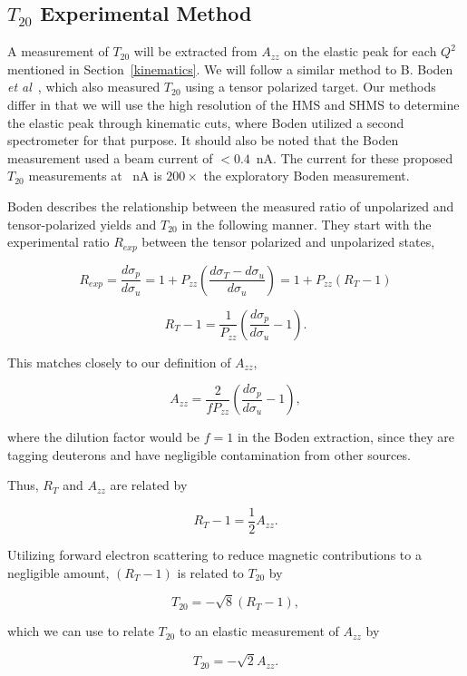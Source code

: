 \subsection{$T_{20}$ Experimental Method} %
\label{t20_exp}

A measurement of $T_{20}$ will be extracted from $A_{zz}$ on the elastic peak for each $Q^2$ mentioned in Section~\ref{kinematics}. We will follow a similar method to B. Boden \emph{et al}~\cite{Boden:1990una}, which also measured $T_{20}$ using a tensor polarized target. Our methods differ in that we will use the high resolution of the HMS and SHMS to determine the elastic peak through kinematic cuts, where Boden utilized a second spectrometer for that purpose. It should also be noted that the Boden measurement used a beam current of $<0.4$~nA. The current for these proposed $T_{20}$ measurements at \CURRENT~nA is $200\times$ the exploratory Boden measurement.

Boden describes the relationship between the measured ratio of unpolarized and tensor-polarized yields and $T_{20}$ in the following manner. They start with the experimental ratio $R_{exp}$ between the tensor polarized and unpolarized states,

\begin{equation}
R_{exp}=\frac{d\sigma_p}{d\sigma_u}=1+P_{zz} \left( \frac{d\sigma_T-d\sigma_u}{d\sigma_u} \right) = 1+P_{zz} \left( R_T-1 \right) 
\end{equation}

\begin{equation}
R_T-1 = \frac{1}{P_{zz}} \left( \frac{d\sigma_p}{d\sigma_u} -1 \right).
\end{equation}

This matches closely to our definition of $A_{zz}$,

\begin{equation}
A_{zz}=\frac{2}{fP_{zz}}\left( \frac{d\sigma_p}{d\sigma_u}-1\right), \end{equation}

where the dilution factor would be $f=1$ in the Boden extraction, since they are tagging deuterons and have negligible contamination from other sources.

Thus, $R_T$ and $A_{zz}$ are related by

\begin{equation}
R_T-1=\frac{1}{2}A_{zz}.
\end{equation}

Utilizing forward electron scattering to reduce magnetic contributions to a negligible amount, $(R_T-1)$ is related to $T_{20}$ by

\begin{equation}
T_{20}=-\sqrt{8}(R_T-1),
\end{equation}

which we can use to relate $T_{20}$ to an elastic measurement of $A_{zz}$ by

\begin{equation}
T_{20}=-\sqrt{2}A_{zz}.
\end{equation}


